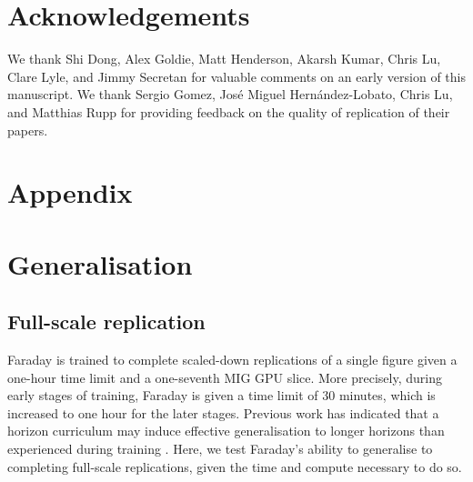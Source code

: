 \documentclass[garamond,a4paper]{inherent}
\newcommand{\faradayname}{Faraday\xspace}
\begin{document}
\section*{Acknowledgements}
We thank Shi Dong, Alex Goldie, Matt Henderson, Akarsh Kumar, Chris Lu, Clare Lyle, and Jimmy Secretan for valuable comments on an early version of this manuscript.
We thank Sergio Gomez, Jos\'{e} Miguel Hern\'{a}ndez-Lobato, Chris Lu, and Matthias Rupp for providing feedback on the quality of replication of their papers.




\FloatBarrier
\newpage

\appendix
{}
\renewcommand{\thefigure}{\thesection.\arabic{figure}}
\setcounter{figure}{0}

\renewcommand{\thetable}{\thesection.\arabic{table}}
\setcounter{table}{0}

\section*{\fontsize{15.5}{18}\selectfont Appendix}

\FloatBarrier
\section{Generalisation}
\label{app:generalization}

\subsection{Full-scale replication}
\label{app:scale-generalization}

\faradayname is trained to complete scaled-down replications of a single figure given a one-hour time limit and a one-seventh MIG GPU slice. More precisely, during early stages of training, \faradayname is given a time limit of $30$ minutes, which is increased to one hour for the later stages. Previous work has indicated that a horizon curriculum may induce effective generalisation to longer horizons than experienced during training \citep{kim2026horizon}. Here, we test Faraday's ability to generalise to completing full-scale replications, given the time and compute necessary to do so.
\end{document}
